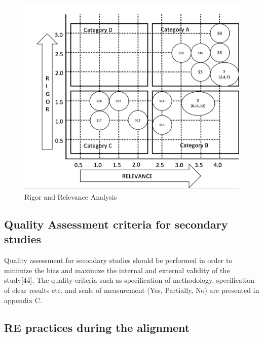 \documentclass{article}
\begin{document}
\begin{figure}
    \centering
    \includegraphics[width=\textwidth]{RigorAndRelevance.png}
    \caption{Rigor and Relevance Analysis}
    \label{fig:my_label}
\end{figure}

\subsection{Quality Assessment criteria for secondary studies}

Quality assessment for secondary studies should be performed in order to minimize the bias and maximize the internal and external validity of the study[44]. The quality criteria such as specification of methodology, specification of clear results etc. and scale of measurement (Yes, Partially, No) are presented in appendix C. 

\subsection{RE practices during the alignment}\label{ResultsPracticesDuringAllignment}
\end{document}
